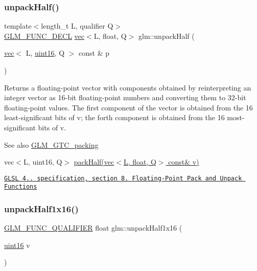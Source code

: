 \subsubsection{\texorpdfstring{unpack\+Half()}{unpackHalf()}}
{\footnotesize\ttfamily template$<$length\+\_\+t L, qualifier Q$>$ \\
\hyperlink{setup_8hpp_ab2d052de21a70539923e9bcbf6e83a51}{G\+L\+M\+\_\+\+F\+U\+N\+C\+\_\+\+D\+E\+CL} \hyperlink{structglm_1_1vec}{vec}$<$L, float, Q$>$ glm\+::unpack\+Half (\begin{DoxyParamCaption}\item[{\hyperlink{structglm_1_1vec}{vec}$<$ L, \hyperlink{group__gtc__type__precision_gad8c2939e1fdd8e5828b31d95c52255d5}{uint16}, Q $>$ const \&}]{p }\end{DoxyParamCaption})}

Returns a floating-\/point vector with components obtained by reinterpreting an integer vector as 16-\/bit floating-\/point numbers and converting them to 32-\/bit floating-\/point values. The first component of the vector is obtained from the 16 least-\/significant bits of v; the forth component is obtained from the 16 most-\/significant bits of v.

\begin{DoxySeeAlso}{See also}
\hyperlink{group__gtc__packing}{G\+L\+M\+\_\+\+G\+T\+C\+\_\+packing} 

vec$<$\+L, uint16, Q$>$ \hyperlink{group__gtc__packing_ga2d8bbce673ebc04831c1fb05c47f5251}{pack\+Half(vec$<$\+L, float, Q$>$ const\& v)} 

\href{http://www.opengl.org/registry/doc/GLSLangSpec.4.20.8.pdf}{\tt G\+L\+SL 4.. specification, section 8. Floating-\/\+Point Pack and Unpack Functions} 
\end{DoxySeeAlso}
\mbox{\label{group__gtc__packing_gaa6eebcdfc746584b7d1823f1d5344fed}} 
\subsubsection{\texorpdfstring{unpack\+Half1x16()}{unpackHalf1x16()}}
{\footnotesize\ttfamily \hyperlink{setup_8hpp_a33fdea6f91c5f834105f7415e2a64407}{G\+L\+M\+\_\+\+F\+U\+N\+C\+\_\+\+Q\+U\+A\+L\+I\+F\+I\+ER} float glm\+::unpack\+Half1x16 (\begin{DoxyParamCaption}\item[{\hyperlink{group__gtc__type__precision_gad8c2939e1fdd8e5828b31d95c52255d5}{uint16}}]{v }\end{DoxyParamCaption})}

